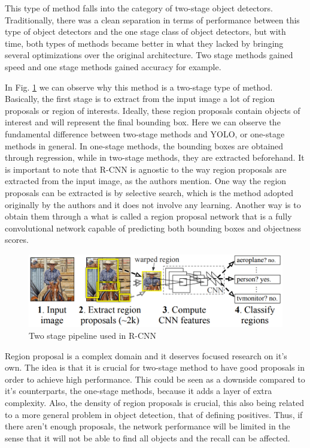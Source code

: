 This type of method falls into the category of two-stage object detectors. Traditionally, there was a clean separation in terms of performance between this type of object detectors and the one stage class of object detectors, but with time, both types of methods became better in what they lacked by bringing several optimizations over the original architecture. Two stage methods gained speed and one stage methods gained accuracy for example.

In Fig. \ref{rcnnImg} we can observe why this method is a two-stage type of method. Basically, the first stage is to extract from the input image a lot of region proposals or region of interests. Ideally, these region proposals contain objects of interest and will represent the final bounding box. Here we can observe the fundamental difference between two-stage methods and YOLO, or one-stage methods in general. In one-stage methods, the bounding boxes are obtained through regression, while in two-stage methods, they are extracted beforehand. It is important to note that R-CNN is agnostic to the way region proposals are extracted from the input image, as the authors mention. One way the region proposals can be extracted is by selective search, which is the method adopted originally by the authors and it does not involve any learning. Another way is to obtain them through a what is called a region proposal network that is a fully convolutional network capable of predicting both bounding boxes and objectness scores.

\begin{figure}[h]
  \centering
  \includegraphics[scale=0.4]{images/rcnn.png}
  \caption{Two stage pipeline used in R-CNN \cite{rcnn}}
  \label{rcnnImg}
\end{figure}

Region proposal is a complex domain and it deserves focused research on it's own. The idea is that it is crucial for two-stage method to have good proposals in order to achieve high performance. This could be seen as a downside compared to it's counterparts, the one-stage methods, because it adds a layer of extra complexity. Also, the density of region proposals is crucial, this also being related to a more general problem in object detection, that of defining positives. Thus, if there aren't enough proposals, the network performance will be limited in the sense that it will not be able to find all objects and the recall can be affected.

